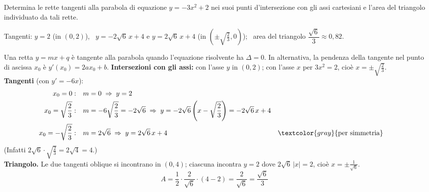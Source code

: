 \begin{question}[ID=3.2, subtitle={Tangenti a $y=-3x^2+2$ negli assi e area del triangolo}, difficulty=facile, tags={parabola, tangente}]
Determina le rette tangenti alla parabola di equazione $y = - 3x^2 + 2$ nei suoi punti d'intersezione con gli assi cartesiani e l'area del triangolo individuato da tali rette.
\begin{solution}
Tangenti: $y=2$ (in $(0,2)$), \ $y=-2\sqrt6\,x+4$ e $y=2\sqrt6\,x+4$ (in $\left(\pm\sqrt{\tfrac23},0\right)$); \ area del triangolo $\dfrac{\sqrt6}{3}\approx0{,}82$.
\end{solution}
\begin{explanation}
Una retta $y=mx+q$ è tangente alla parabola quando l'equazione risolvente ha $\Delta=0$. In alternativa, la pendenza della tangente nel punto di ascissa $x_0$ è $y'(x_0)=2ax_0+b$.
\textbf{Intersezioni con gli assi:} con l'asse $y$ in $(0,2)$; con l'asse $x$ per $3x^2=2$, cioè $x=\pm\sqrt{\tfrac23}$. \\
\textbf{Tangenti} (con $y'=-6x$):
\[\begin{aligned}
x_0=0: &\quad m=0 \;\Rightarrow\; y=2\\
x_0=\sqrt{\dfrac23}: &\quad m=-6\sqrt{\dfrac23}=-2\sqrt6 \;\Rightarrow\; y=-2\sqrt6\left(x-\sqrt{\dfrac23}\right)=-2\sqrt6\,x+4\\
x_0=-\sqrt{\dfrac23}: &\quad m=2\sqrt6 \;\Rightarrow\; y=2\sqrt6\,x+4 && \textcolor{gray}{\text{per simmetria}}
\end{aligned}\]
(Infatti $2\sqrt6\cdot\sqrt{\tfrac23}=2\sqrt4=4$.) \\
\textbf{Triangolo.} Le due tangenti oblique si incontrano in $(0,4)$; ciascuna incontra $y=2$ dove $2\sqrt6\,|x|=2$, cioè $x=\pm\tfrac{1}{\sqrt6}$.
\[ A=\dfrac12\cdot\dfrac{2}{\sqrt6}\cdot(4-2)=\dfrac{2}{\sqrt6}=\dfrac{\sqrt6}{3} \]
\end{explanation}
\end{question}


